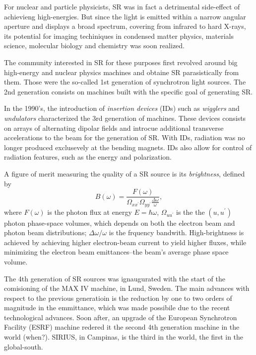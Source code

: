 For nuclear and particle physicists, SR was in fact a detrimental side-effect of achievieng high-energies. But since the light is emitted within a narrow angular aperture and displays a broad spectrum, covering from infrared to hard X-rays, its potential for imaging techiniques in condensed matter physics, materials science, molecular biology and chemistry was soon realized.

The community interested in SR for these purposes first revolved around big high-energy and nuclear physics machines and obtaine SR parasistically from them. Those were the so-called 1st generation of synchrotron light sources. The 2nd generation consists on machines built with the specific goal of generating SR.

In the 1990's, the introduction of \textit{insertion devices} (IDs) such as \textit{wigglers} and \textit{undulators} characterized the 3rd generation of machines. These devices consists on arrays of alternating dipolar fields and introcue additional transverse accelerations to the beam for the generation of SR. With IDs, radiation was no longer produced exclusevely at the bending magnets. IDs also allow for control of radiation features, such as the energy and polarization.

A figure of merit measuring the quality of a SR source is its \textit{brightness}, defined by
\begin{equation}
    B(\omega) = \frac{F(\omega)}{\Omega_{xx^\prime}\Omega_{yy^\prime}\frac{\Delta \omega}{\omega}},
\end{equation}
where $F(\omega)$ is the photon flux at energy $E=\hbar\omega$, $\Omega_{uu^\prime}$ is the the $(u,u^\prime)$ photon phase-space volumes, which depends on both the electron beam and photon beam distributions; $\Delta\omega/\omega$ is the frquency bandwith. High-brightness is achieved by achieving higher electron-beam current to yield higher fluxes, while minimizing the electron beam emittances--the beam's average phase space volume.

The 4th generation of SR sources was ignaugurated with the start of the comisioning of the MAX IV machine, in Lund, Sweden. The main advances with respect to the previous generatioin is the reduction by one to two orders of magnitude in the emmittance, which was made possibile due to the recent technological advances. Soon after, an upgrade of the European Synchrotron Facility (ESRF) machine redered it the second 4th generation machine in the world (when?). SIRIUS, in Campinas, is the third in the world, the first in the global-south.

